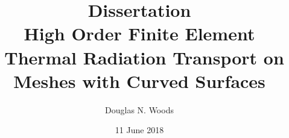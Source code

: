\documentclass[12pt]{article}
\begin{document}

\title{Dissertation \\High Order Finite Element \SN\ Thermal Radiation Transport on Meshes with Curved Surfaces}
\date{11 June 2018}
\author{Douglas N. Woods}
\maketitle

%

%

%

%

%

\pagebreak
\tableofcontents
\thispagestyle{empty}

\pagebreak
\listoffigures
\thispagestyle{empty}

\pagebreak
\listoftables
\thispagestyle{empty}

\pagebreak
{}
\end{document}
